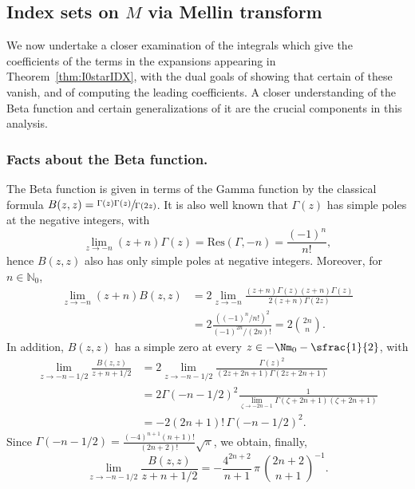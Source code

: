 \subsection{Index sets on $M$ via Mellin transform} \label{sec:MellinBeta}

We now undertake a closer examination of the integrals which give the coefficients of the terms in the expansions appearing in
Theorem~\ref{thm:I0starIDX}, with the dual goals of showing that certain of these vanish, and of computing the leading coefficients.
A closer understanding of the Beta function and certain generalizations of it are the crucial components in this analysis.

\label{sec:beta}

\subsubsection*{Facts about the Beta function.} The Beta function is given in terms of the Gamma function by the classical formula
$B(z,z) = \sfrac{\Gamma(z)\Gamma(z)}{\Gamma(2z)}$. It is also well known that $\Gamma(z)$ has simple poles at the
negative integers, with
\[
\lim_{z\to -n} (z+n) \Gamma(z) = \mathrm{Res}(\Gamma, -n) = \frac{(-1)^n}{n!},
\]
hence $B(z,z)$ also
has only simple poles at negative integers. Moreover, for $n \in \mathbb N_0$,
\begin{equation}\label{eq:residueB}
\begin{aligned}
\lim_{z\to -n} (z+n) B(z,z) &= 2\lim_{z\to -n} \frac{(z+n) \Gamma(z) (z+n)\Gamma(z)}{2(z+n) \Gamma(2z)}\\
&=2 \frac{((-1)^n/n!)^2}{(-1)^{2n}/ (2n)! } = 2 \binom{2n}{n}.
\end{aligned}
\end{equation}
In addition, $B(z,z)$ has a simple zero at every $z \in -\Nm_0-\sfrac{1}{2}$, with
\begin{align*}
\lim_{z\to -n-1/2} \frac{B(z,z)}{z+n+1/2} &= 2\lim_{z\to -n-1/2} \frac{\Gamma(z)^2}{(2z+2n+1)\Gamma(2z+2n+1)} \\
&= 2\Gamma(-n-1/2)^2 \frac{1}{\lim_{\zeta\to -2n-1} \Gamma(\zeta+2n+1)(\zeta+2n+1)} \\
&= -2 (2n+1) ! \, \Gamma(-n-1/2)^2.
\end{align*}
Since $\Gamma(-n-1/2) = \frac{(-4)^{n+1} (n+1)!}{(2n+2)!} \sqrt{\pi}$, we obtain, finally,
\begin{equation}
\lim_{z\to -n-1/2} \frac{B(z,z)}{z+n+1/2} = -\frac{4^{2n+2}}{n+1} \, \pi \, \binom{2n+2}{n+1}^{-1}.
\label{eq:antiresidue}
\end{equation}

